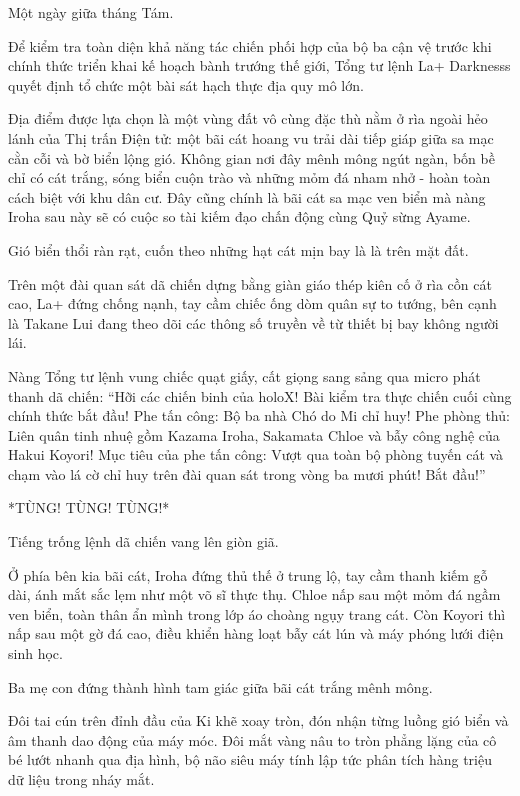 \documentclass[../main.tex]{subfiles}
\begin{document}
\ct

Một ngày giữa tháng Tám.

Để kiểm tra toàn diện khả năng tác chiến phối hợp của bộ ba cận vệ trước khi chính thức triển khai kế hoạch bành trướng thế giới, Tổng tư lệnh La+ Darknesss quyết định tổ chức một bài sát hạch thực địa quy mô lớn.

Địa điểm được lựa chọn là một vùng đất vô cùng đặc thù nằm ở rìa ngoài hẻo lánh của Thị trấn Điện tử: một bãi cát hoang vu trải dài tiếp giáp giữa sa mạc cằn cỗi và bờ biển lộng gió. Không gian nơi đây mênh mông ngút ngàn, bốn bề chỉ có cát trắng, sóng biển cuộn trào và những mỏm đá nham nhở - hoàn toàn cách biệt với khu dân cư. Đây cũng chính là bãi cát sa mạc ven biển mà nàng Iroha sau này sẽ có cuộc so tài kiếm đạo chấn động cùng Quỷ sừng Ayame.

Gió biển thổi ràn rạt, cuốn theo những hạt cát mịn bay là là trên mặt đất.

Trên một đài quan sát dã chiến dựng bằng giàn giáo thép kiên cố ở rìa cồn cát cao, La+ đứng chống nạnh, tay cầm chiếc ống dòm quân sự to tướng, bên cạnh là Takane Lui đang theo dõi các thông số truyền về từ thiết bị bay không người lái.

Nàng Tổng tư lệnh vung chiếc quạt giấy, cất giọng sang sảng qua micro phát thanh dã chiến: ``Hỡi các chiến binh của holoX! Bài kiểm tra thực chiến cuối cùng chính thức bắt đầu! Phe tấn công: Bộ ba nhà Chó do Mi chỉ huy! Phe phòng thủ: Liên quân tinh nhuệ gồm Kazama Iroha, Sakamata Chloe và bẫy công nghệ của Hakui Koyori! Mục tiêu của phe tấn công: Vượt qua toàn bộ phòng tuyến cát và chạm vào lá cờ chỉ huy trên đài quan sát trong vòng ba mươi phút! Bắt đầu!''

*TÙNG! TÙNG! TÙNG!*

Tiếng trống lệnh dã chiến vang lên giòn giã.

Ở phía bên kia bãi cát, Iroha đứng thủ thế ở trung lộ, tay cầm thanh kiếm gỗ dài, ánh mắt sắc lẹm như một võ sĩ thực thụ. Chloe nấp sau một mỏm đá ngầm ven biển, toàn thân ẩn mình trong lớp áo choàng ngụy trang cát. Còn Koyori thì nấp sau một gờ đá cao, điều khiển hàng loạt bẫy cát lún và máy phóng lưới điện sinh học.

Ba mẹ con đứng thành hình tam giác giữa bãi cát trắng mênh mông.

Đôi tai cún trên đỉnh đầu của Ki khẽ xoay tròn, đón nhận từng luồng gió biển và âm thanh dao động của máy móc. Đôi mắt vàng nâu to tròn phẳng lặng của cô bé lướt nhanh qua địa hình, bộ não siêu máy tính lập tức phân tích hàng triệu dữ liệu trong nháy mắt.
\end{document}
